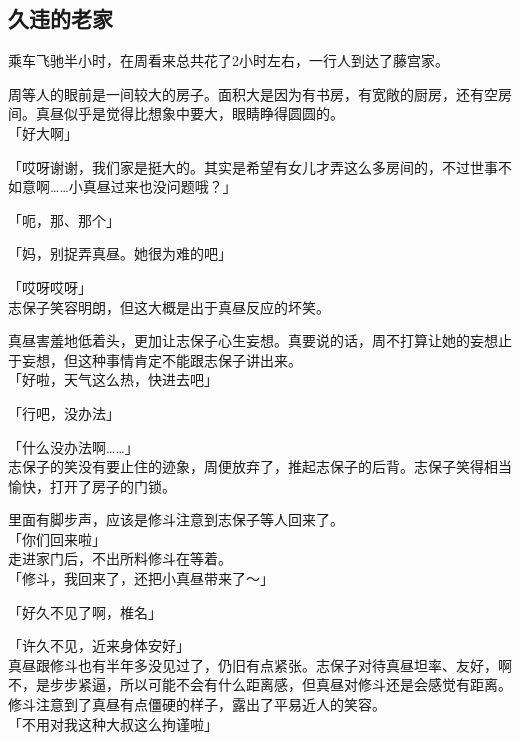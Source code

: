 \subsection{久违的老家}

乘车飞驰半小时，在周看来总共花了2小时左右，一行人到达了藤宫家。

周等人的眼前是一间较大的房子。面积大是因为有书房，有宽敞的厨房，还有空房间。真昼似乎是觉得比想象中要大，眼睛睁得圆圆的。\\

「好大啊」

「哎呀谢谢，我们家是挺大的。其实是希望有女儿才弄这么多房间的，不过世事不如意啊……小真昼过来也没问题哦？」

「呃，那、那个」

「妈，别捉弄真昼。她很为难的吧」

「哎呀哎呀」\\

志保子笑容明朗，但这大概是出于真昼反应的坏笑。

真昼害羞地低着头，更加让志保子心生妄想。真要说的话，周不打算让她的妄想止于妄想，但这种事情肯定不能跟志保子讲出来。\\

「好啦，天气这么热，快进去吧」

「行吧，没办法」

「什么没办法啊……」\\

志保子的笑没有要止住的迹象，周便放弃了，推起志保子的后背。志保子笑得相当愉快，打开了房子的门锁。

里面有脚步声，应该是修斗注意到志保子等人回来了。\\

「你们回来啦」\\

走进家门后，不出所料修斗在等着。\\

「修斗，我回来了，还把小真昼带来了～」

「好久不见了啊，椎名」

「许久不见，近来身体安好」\\

真昼跟修斗也有半年多没见过了，仍旧有点紧张。志保子对待真昼坦率、友好，啊不，是步步紧逼，所以可能不会有什么距离感，但真昼对修斗还是会感觉有距离。\\

修斗注意到了真昼有点僵硬的样子，露出了平易近人的笑容。\\

「不用对我这种大叔这么拘谨啦」

